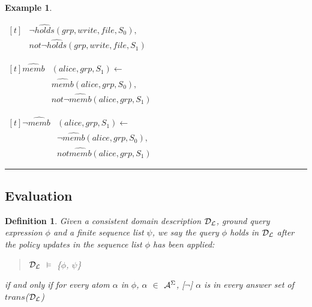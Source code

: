 \documentclass[10pt, twocolumn]{article}
\newtheorem{definition}{Definition}
\newtheorem{examp}{Example}
\newenvironment{example}{\begin{examp}\rm}{\rule{2mm}{2mm}\end{examp}}
\begin{document}
\begin{example}
\begin{list}{}{Inertial Rules}
\begin{math}
\begin{aligned}[t]
                    & \lnot \hat{holds}(grp, write, file, S_{0}), \\
                    & not \lnot \hat{holds}(grp, write, file, S_{1})
                  \end{aligned}
              \end{math}
            \item
              \begin{math}
                  \begin{aligned}[t]
                    \hat{memb}&(alice, grp, S_{1}) \leftarrow \\
                    & \hat{memb}(alice, grp, S_{0}), \\
                    & not \lnot \hat{memb}(alice, grp, S_{1})
                  \end{aligned}
              \end{math}
            \item
              \begin{math}
                  \begin{aligned}[t]
                    \lnot \hat{memb}&(alice, grp, S_{1}) \leftarrow \\
                    & \lnot \hat{memb}(alice, grp, S_{0}), \\
                    & not \hat{memb}(alice, grp, S_{1})
                  \end{aligned}
              \end{math}
          \end{list}
        \end{example}

      \subsection{Evaluation}

        \begin{definition}
          Given a consistent domain description ${\cal D}_{\cal L}$, ground
          query expression $\phi$ and a finite sequence list $\psi$, we say the
          query $\phi$ holds in ${\cal D}_{\cal L}$ after the policy updates
          in the sequence list $\phi$ has been applied:

          \begin{quote}
            ${\cal D}_{\cal L}$ $\models$ \{$\phi$, $\psi$\}
          \end{quote}

          \noindent if and only if for every atom $\alpha$ in $\phi$, $\alpha$
          $\in$ ${\cal A}^{\Sigma}$, [$\lnot$] $\alpha$ is in every answer
          set of $trans$(${\cal D}_{\cal L}$)
        \end{definition}
\end{document}
